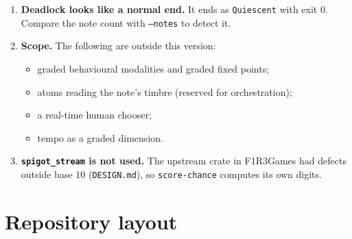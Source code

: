 \documentclass[11pt,a4paper]{article}
\newcommand{\ttx}[1]{\texttt{#1}}
\begin{document}
\begin{enumerate}
  specification writes \ttx{replay piece.score run.jsonl} and
  \ttx{machine import FILE --pitches SCORE}. The binary takes \ttx{replay TRACE
  --score SCORE} and \ttx{machine import FILE --kind pitch|dur --score SCORE}.
  This guide follows the binary.
\item \textbf{Deadlock looks like a normal end.} It ends as \ttx{Quiescent}
  with exit 0. Compare the note count with \ttx{--notes} to detect it.
\item \textbf{Scope.} The following are outside this version:
  \begin{itemize}
  \item graded behavioural modalities and graded fixed points;
  \item atoms reading the note's timbre (reserved for orchestration);
  \item a real-time human chooser;
  \item tempo as a graded dimension.
  \end{itemize}
\item \textbf{\ttx{spigot\_stream} is not used.} The upstream crate in
  F1R3Games had defects outside base 10 (\ttx{DESIGN.md}), so
  \ttx{score-chance} computes its own digits.
\end{enumerate}

\appendix
\section{Repository layout}
\end{document}
